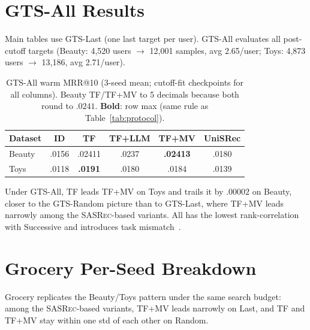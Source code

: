 \documentclass[sigconf,natbib=true,anonymous]{acmart}
\newcommand{\tfmv}{\textsc{TF+MV}\xspace}
\newcommand{\base}{\textsc{SASRec}\xspace}
\begin{document}
\section{GTS-All Results}
\label{app:gts-all}

Main tables use GTS-Last (one last target per user).
GTS-All evaluates all post-cutoff targets (Beauty: 4{,}520 users $\to$ 12{,}001 samples, avg 2.65/user; Toys: 4{,}873 users $\to$ 13{,}186, avg 2.71/user).

\begin{table}[H]
\centering
\caption{GTS-All warm MRR@10 (3-seed mean; cutoff-fit checkpoints for all columns).
Beauty TF/\tfmv to 5 decimals because both round to $.0241$.
\textbf{Bold}: row max (same rule as Table~\ref{tab:protocol}).}
\label{tab:gts-all}
\small
\begin{tabular}{@{}lccccc@{}}
\toprule
Dataset & ID & TF & TF+LLM & TF+MV & UniSRec \\
\midrule
Beauty & .0156 & .02411 & .0237 & \textbf{.02413} & .0180 \\
Toys   & .0118 & \textbf{.0191} & .0180 & .0184 & .0139 \\
\bottomrule
\end{tabular}
\end{table}

Under GTS-All, TF leads \tfmv on Toys and trails it by $.00002$ on Beauty, closer to the GTS-Random picture than to GTS-Last, where \tfmv leads narrowly among the \base-based variants.
All has the lowest rank-correlation with Successive and introduces task mismatch~\cite{gusak2025time}.

\section{Grocery Per-Seed Breakdown}
\label{app:grocery}

Grocery replicates the Beauty/Toys pattern under the same search budget: among the \base-based variants, \tfmv leads narrowly on Last, and TF and \tfmv stay within one std of each other on Random.
\end{document}
